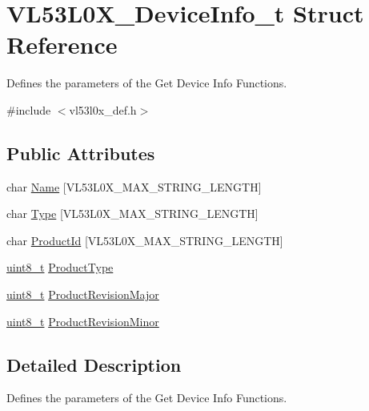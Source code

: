 \hypertarget{structVL53L0X__DeviceInfo__t}{}\section{V\+L53\+L0\+X\+\_\+\+Device\+Info\+\_\+t Struct Reference}
\label{structVL53L0X__DeviceInfo__t}


Defines the parameters of the Get Device Info Functions.  




{\ttfamily \#include $<$vl53l0x\+\_\+def.\+h$>$}

\subsection*{Public Attributes}
\begin{DoxyCompactItemize}
\item 
char \hyperlink{structVL53L0X__DeviceInfo__t_a81aa49d769fa4e0f2590dc688c925b12}{Name} \mbox{[}V\+L53\+L0\+X\+\_\+\+M\+A\+X\+\_\+\+S\+T\+R\+I\+N\+G\+\_\+\+L\+E\+N\+G\+TH\mbox{]}
\item 
char \hyperlink{structVL53L0X__DeviceInfo__t_a99a008cd6140008b73d4935b91590798}{Type} \mbox{[}V\+L53\+L0\+X\+\_\+\+M\+A\+X\+\_\+\+S\+T\+R\+I\+N\+G\+\_\+\+L\+E\+N\+G\+TH\mbox{]}
\item 
char \hyperlink{structVL53L0X__DeviceInfo__t_a912abccffc0a6038c755a5c5b2214fce}{Product\+Id} \mbox{[}V\+L53\+L0\+X\+\_\+\+M\+A\+X\+\_\+\+S\+T\+R\+I\+N\+G\+\_\+\+L\+E\+N\+G\+TH\mbox{]}
\item 
\hyperlink{vl53l0x__types_8h_aba7bc1797add20fe3efdf37ced1182c5}{uint8\+\_\+t} \hyperlink{structVL53L0X__DeviceInfo__t_ad922e4cf248a21df3afc476e40b89955}{Product\+Type}
\item 
\hyperlink{vl53l0x__types_8h_aba7bc1797add20fe3efdf37ced1182c5}{uint8\+\_\+t} \hyperlink{structVL53L0X__DeviceInfo__t_a98733411ff0621c5e35a386d92dfaca6}{Product\+Revision\+Major}
\item 
\hyperlink{vl53l0x__types_8h_aba7bc1797add20fe3efdf37ced1182c5}{uint8\+\_\+t} \hyperlink{structVL53L0X__DeviceInfo__t_a01b06c72fa7c5e21a1ae59fbd4dd5671}{Product\+Revision\+Minor}
\end{DoxyCompactItemize}


\subsection{Detailed Description}
Defines the parameters of the Get Device Info Functions. 

